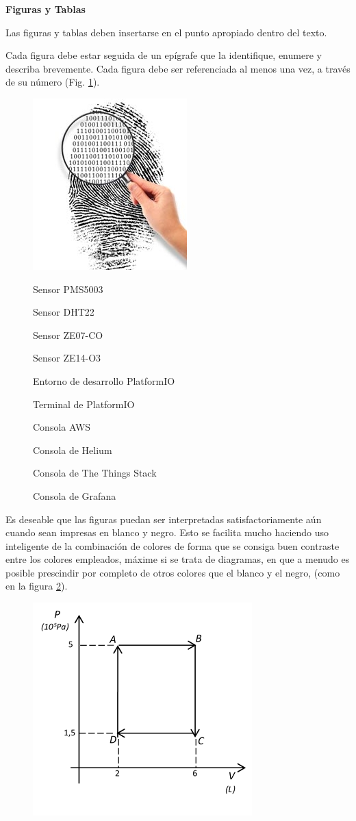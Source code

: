 \textbf{Figuras y Tablas}

Las figuras y tablas deben insertarse en el punto apropiado dentro del texto.

Cada figura debe estar seguida de un epígrafe que la identifique, enumere y describa brevemente. Cada figura debe ser referenciada al menos una vez, a través de su número (Fig. \ref{fig:huella}).

\begin{figure}[H]
\begin{center}
\includegraphics[scale = .5]{./capitulo_04/huella}
\caption{Sensor PMS5003}
\caption{Sensor DHT22}
\caption{Sensor ZE07-CO}
\caption{Sensor ZE14-O3}
\caption{Entorno de desarrollo PlatformIO}
\caption{Terminal de PlatformIO}
\caption{Consola AWS}
\caption{Consola de Helium}
\caption{Consola de The Things Stack}
\caption{Consola de Grafana}


\label{fig:huella}
\end{center}
\end{figure}

Es deseable que las figuras puedan ser interpretadas satisfactoriamente aún cuando sean impresas en blanco y negro. Esto se facilita mucho haciendo uso inteligente de la combinación de colores de forma que se consiga buen contraste entre los colores empleados, máxime si se trata de diagramas, en que a menudo es posible prescindir por completo de otros colores que el blanco y el negro, (como en la figura \ref{fig:termodin}).

\begin{figure}[H]
\begin{center}
\includegraphics{./capitulo_04/termodin.png}
\label{fig:termodin}
\end{center}
\end{figure}

